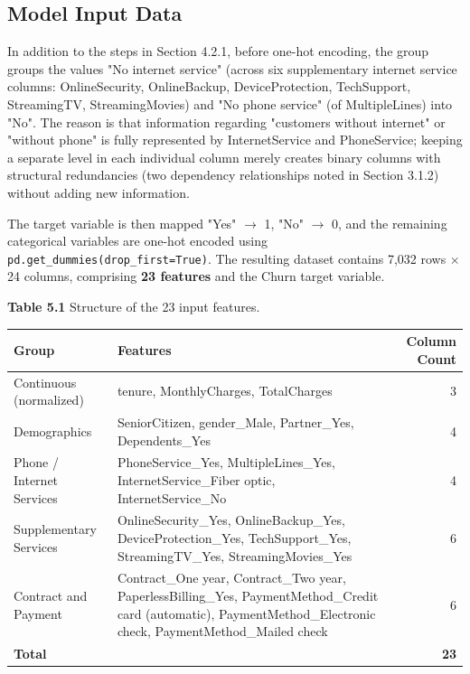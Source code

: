 \subsection{ Model Input Data}

In addition to the steps in Section 4.2.1, before one-hot encoding, the group groups the values "No internet service" (across six supplementary internet service columns: OnlineSecurity, OnlineBackup, DeviceProtection, TechSupport, StreamingTV, StreamingMovies) and "No phone service" (of MultipleLines) into "No". The reason is that information regarding "customers without internet" or "without phone" is fully represented by InternetService and PhoneService; keeping a separate level in each individual column merely creates binary columns with structural redundancies (two dependency relationships noted in Section 3.1.2) without adding new information.

The target variable is then mapped "Yes" $\rightarrow$ 1, "No" $\rightarrow$ 0, and the remaining categorical variables are one-hot encoded using \texttt{pd.get\_dummies(drop\_first=True)}. The resulting dataset contains 7,032 rows $\times$ 24 columns, comprising \textbf{23 features} and the Churn target variable.

\vspace{0.5em}
\noindent\textbf{Table 5.1} Structure of the 23 input features.

\begin{center}
\small
\begin{tabularx}{\textwidth}{>{\raggedright\arraybackslash}p{4.3cm} X r}
\toprule
\textbf{Group} & \textbf{Features} & \textbf{Column Count} \\
\midrule
Continuous (normalized) & tenure, MonthlyCharges, TotalCharges & 3 \\
\addlinespace
Demographics & SeniorCitizen, gender\_Male, Partner\_Yes, Dependents\_Yes & 4 \\
\addlinespace
Phone / Internet Services & PhoneService\_Yes, MultipleLines\_Yes, InternetService\_Fiber optic, InternetService\_No & 4 \\
\addlinespace
Supplementary Services & OnlineSecurity\_Yes, OnlineBackup\_Yes, DeviceProtection\_Yes, TechSupport\_Yes, StreamingTV\_Yes, StreamingMovies\_Yes & 6 \\
\addlinespace
Contract and Payment & Contract\_One year, Contract\_Two year, PaperlessBilling\_Yes, PaymentMethod\_Credit card (automatic), PaymentMethod\_Electronic check, PaymentMethod\_Mailed check & 6 \\
\midrule
\textbf{Total} & & \textbf{23} \\
\bottomrule
\end{tabularx}
\end{center}

